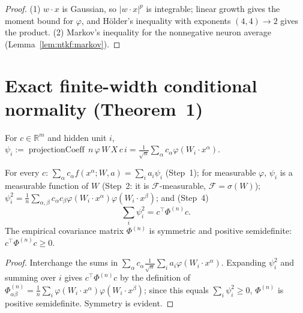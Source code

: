 \begin{proof}
  \leanok
(1) $w\cdot x$ is Gaussian, so $|w\cdot x|^p$ is integrable; linear growth gives the moment bound for $\varphi$, and Hölder's inequality with exponents $(4,4)\to2$ gives the product. (2) Markov's inequality for the nonnegative neuron average (Lemma~\ref{lem:ntkf:markov}).
\end{proof}


\section{Exact finite-width conditional normality (Theorem~1)}\label{sec:ntkdeep:conditionalNormality}

\begin{definition}\label{def:ntkdeep:projectionCoeff}
  \leanok
For $c\in\mathbb R^m$ and hidden unit $i$, $\psi_i:=\operatorname{projectionCoeff}\,n\,\varphi\,W\,X\,c\,i=\frac1{\sqrt n}\sum_\alpha c_\alpha\varphi(W_i\cdot x^\alpha)$.
\end{definition}

\begin{lemma}\label{lem:ntkdeep:projectionIdentities}
  \leanok
For every $c$: $\sum_\alpha c_\alpha f(x^\alpha;W,a)=\sum_ia_i\psi_i$ (Step~1); for measurable $\varphi$, $\psi_i$ is a measurable function of $W$ (Step~2: it is $\mathcal F$-measurable, $\mathcal F=\sigma(W)$); $\psi_i^2=\frac1n\sum_{\alpha,\beta}c_\alpha c_\beta\varphi(W_i\cdot x^\alpha)\varphi(W_i\cdot x^\beta)$; and (Step~4)
\[
  \sum_i\psi_i^2=c^\top\Phi^{(n)}c .
\]
The empirical covariance matrix $\Phi^{(n)}$ is symmetric and positive semidefinite: $c^\top\Phi^{(n)}c\ge0$.
\end{lemma}

\begin{proof}
  \leanok
Interchange the sums in $\sum_\alpha c_\alpha\frac1{\sqrt n}\sum_ia_i\varphi(W_i\cdot x^\alpha)$. Expanding $\psi_i^2$ and summing over $i$ gives $c^\top\Phi^{(n)}c$ by the definition of $\Phi^{(n)}_{\alpha\beta}=\frac1n\sum_i\varphi(W_i\cdot x^\alpha)\varphi(W_i\cdot x^\beta)$; since this equals $\sum_i\psi_i^2\ge0$, $\Phi^{(n)}$ is positive semidefinite. Symmetry is evident.
\end{proof}

